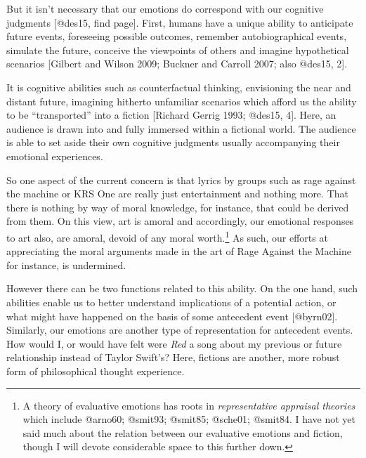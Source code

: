 \documentclass[
  letterpaper,
  DIV=11,
  numbers=noendperiod]{scrartcl}
\theoremstyle{remark}
\begin{document}
But it isn't necessary that our emotions do correspond with our
cognitive judgments {[}@des15, find page{]}. First, humans have a unique
ability to anticipate future events, foreseeing possible outcomes,
remember autobiographical events, simulate the future, conceive the
viewpoints of others and imagine hypothetical scenarios {[}Gilbert and
Wilson 2009; Buckner and Carroll 2007; also @des15, 2{]}.

It is cognitive abilities such as counterfactual thinking, envisioning
the near and distant future, imagining hitherto unfamiliar scenarios
which afford us the ability to be ``transported'' into a fiction
{[}Richard Gerrig 1993; @des15, 4{]}. Here, an audience is drawn into
and fully immersed within a fictional world. The audience is able to set
aside their own cognitive judgments usually accompanying their emotional
experiences.

So one aspect of the current concern is that lyrics by groups such as
rage against the machine or KRS One are really just entertainment and
nothing more. That there is nothing by way of moral knowledge, for
instance, that could be derived from them. On this view, art is amoral
and accordingly, our emotional responses to art also, are amoral, devoid
of any moral worth.\footnote{A theory of evaluative emotions has roots
  in \emph{representative appraisal theories} which include @arno60;
  @smit93; @smit85; @sche01; @smit84. I have not yet said much about the
  relation between our evaluative emotions and fiction, though I will
  devote considerable space to this further down.} As such, our efforts
at appreciating the moral arguments made in the art of Rage Against the
Machine for instance, is undermined.

However there can be two functions related to this ability. On the one
hand, such abilities enable us to better understand implications of a
potential action, or what might have happened on the basis of some
antecedent event {[}@byrn02{]}. Similarly, our emotions are another type
of representation for antecedent events. How would I, or would have felt
were \emph{Red} a song about my previous or future relationship instead
of Taylor Swift's? Here, fictions are another, more robust form of
philosophical thought experience.
\end{document}

